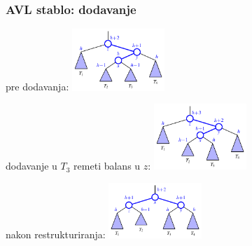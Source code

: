 \documentclass[compress,aspectratio=169]{beamer}
\begin{document}
\begin{frame}[fragile]
  \frametitle{AVL stablo: dodavanje}
pre dodavanja: \includegraphics[width=3.5cm]{asp-11-pic16a.pdf}

dodavanje u $T_3$ remeti balans u $z$: \includegraphics[width=3.5cm]{asp-11-pic16b.pdf}

nakon restrukturiranja: \includegraphics[width=3.5cm]{asp-11-pic16c.pdf}
\end{frame}
\end{document}
